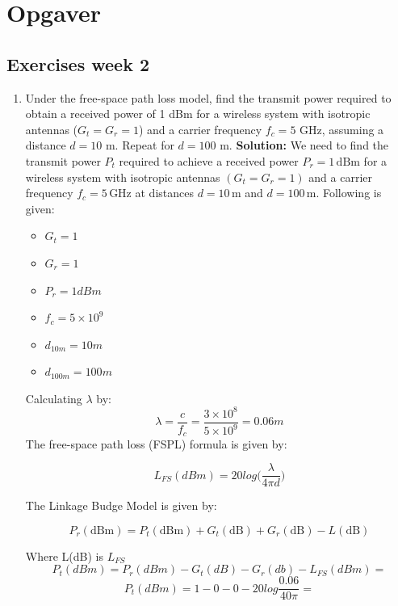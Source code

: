 \documentclass[a4paper,12pt]{book}
\begin{document}
	\chapter{Opgaver}
	\section{Exercises week 2}
	
	\begin{enumerate}
		\item Under the free-space path loss model, find the transmit power required to obtain a received power of 1 dBm for a wireless system with isotropic antennas ($G_t = G_r = 1$) and a carrier frequency $f_c = 5$ GHz, assuming a distance $d = 10$ m. Repeat for $d = 100$ m.
		\newline\newline\noindent
		\textbf{Solution:} We need to find the transmit power \( P_t \) required to achieve a received power \( P_r = 1 \, \text{dBm} \) for a wireless system with isotropic antennas \( (G_t = G_r = 1) \) and a carrier frequency \( f_c = 5 \, \text{GHz} \) at distances \( d = 10 \, \text{m} \) and \( d = 100 \, \text{m} \). Following is given:
		
		\begin{itemize}
			\item \(G_t = 1\)
			\item \(G_r = 1\)
			\item \(P_r = 1 dBm\)
			\item \(f_c = 5\times10^9\)
			\item \(d_{10m} = 10 m\)
			\item \(d_{100m} = 100 m\)
		\end{itemize}
		Calculating \(\lambda\) by:
		\[
			\lambda=\frac{c}{f_c}=\frac{3\times10^8}{5\times10^9}=0.06m
		\]
		The free-space path loss (FSPL) formula is given by:
		
		\[
			L_{FS}(dBm) = 20log\bigg(\frac{\lambda}{4\pi d}\bigg)
		\]
		
		The Linkage Budge Model is given by:
		
		\[
		P_r (\text{dBm}) = P_t (\text{dBm}) + G_t (\text{dB}) + G_r (\text{dB}) - L (\text{dB})
		\]
		
		Where L(dB) is \(L_{FS}\)
		\newline\newline\noindent
		\[
			P_t(dBm)=P_r(dBm)-G_t(dB)-G_r(db)-L_{FS}(dBm)=
		\]
		\[
		P_t(dBm)=1-0-0-20log\frac{0.06}{40\pi}=
		\]
		

\end{enumerate}
\end{document}
